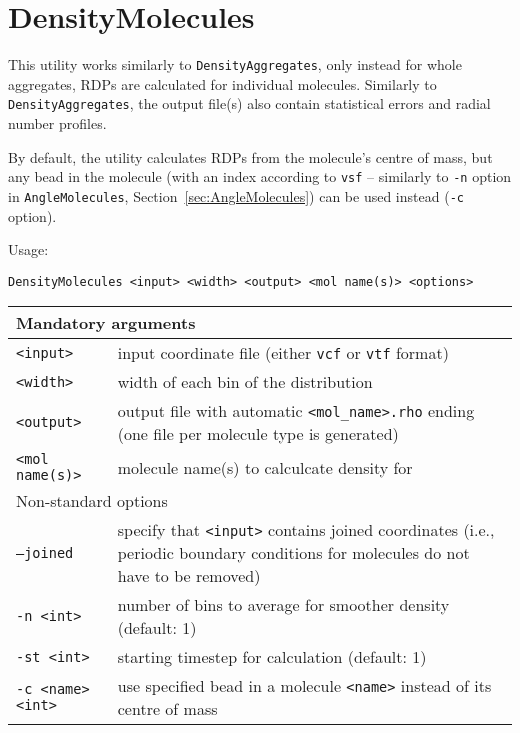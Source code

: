 \section{DensityMolecules} \label{sec:DensityMolecules}

This utility works similarly to \texttt{DensityAggregates}, only instead
for whole aggregates, RDPs are calculated for individual molecules.
Similarly to \texttt{DensityAggregates}, the output file(s) also contain
statistical errors and radial number profiles.

By default, the utility calculates RDPs from the molecule's centre of mass,
but any bead in the molecule (with an index according to \texttt{vsf} --
similarly to \texttt{-n} option in \texttt{AngleMolecules},
Section~\ref{sec:AngleMolecules}) can be used instead (\texttt{-c} option).

Usage:

\vspace{1em}
\noindent
\texttt{DensityMolecules <input> <width> <output> <mol name(s)> <options>}

\noindent
\begin{longtable}{p{}p{}}
  \toprule
  \multicolumn{2}{l}{Mandatory arguments} \\
  \midrule
  \texttt{<input>} & input coordinate file (either \texttt{vcf} or
    \texttt{vtf} format) \\
  \texttt{<width>} & width of each bin of the distribution \\
  \texttt{<output>} & output file with automatic \texttt{<mol\_name>.rho}
    ending (one file per molecule type is generated) \\
  \texttt{<mol name(s)>} & molecule name(s) to calculcate density for \\
  \toprule
  \multicolumn{2}{l}{Non-standard options} \\
  \midrule
  \texttt{--joined} & specify that \texttt{<input>} contains joined
    coordinates (i.e., periodic boundary conditions for molecules do not
    have to be removed) \\
  \texttt{-n <int>} & number of bins to average for smoother density
    (default: 1) \\
  \texttt{-st <int>} & starting timestep for calculation (default: 1) \\
  \texttt{-c <name> <int>} & use specified bead in a molecule
    \texttt{<name>} instead of its centre of mass \\
  \bottomrule
\end{longtable}

